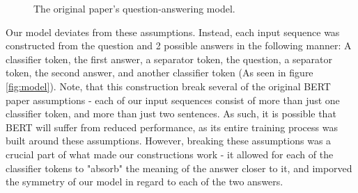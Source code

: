 \documentclass{article}
\begin{document}

\begin{figure}[h!]
\begin{center}
\end{center}
\caption{The original paper's question-answering model.}
\label{fig:model_orig}
\end{figure}

Our model deviates from these assumptions. Instead, each input sequence was constructed from the question and 2 possible answers in the following manner: A classifier token, the first answer, a separator token, the question, a separator token, the second answer, and another classifier token (As seen in figure \ref{fig:model}). Note, that this construction break several of the original BERT paper assumptions - each of our input sequences consist of more than just one classifier token, and more than just two sentences. As such, it is possible that BERT will suffer from reduced performance, as its entire training process was built around these assumptions.
However, breaking these assumptions was a crucial part of what made our constructions work - it allowed for each of the classifier tokens to "absorb" the meaning of the answer closer to it, and imporved the symmetry of our model in regard to each of the two answers.
\end{document}

